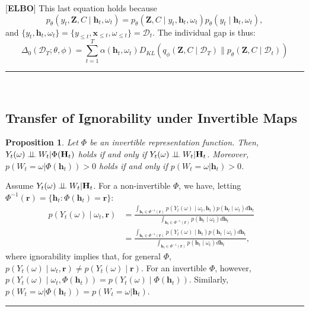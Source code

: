 \documentclass[10pt]{article} %
\newcommand{\BlackBox}{\rule{1.5ex}{1.5ex}}  %
\renewenvironment{proof}{\par\noindent{\bf Proof\ }}{\hfill\BlackBox\\[2mm]}
\newenvironment{proof}{\par\noindent{\bf Proof\ }}{\hfill\BlackBox\\[2mm]}
\newtheorem{proposition}[theorem]{Proposition}
\begin{document}
\begin{proof}[\textbf{ELBO}]
This last equation holds because 
\[
p_\theta\left(y_{t}, \mathbf{Z}, C \mid \mathbf{h}_{t}, \omega_{t}\right) = p_\theta\left(\mathbf{Z}, C \mid y_{t}, \mathbf{h}_{t}, \omega_{t}\right) p_\theta\left(y_{t} \mid \mathbf{h}_{t}, \omega_{t}\right),
\]
and \(\{y_{t}, \mathbf{h}_{t}, \omega_{t}\} = \{y_{\leq t}, \mathbf{x}_{\leq t}, \omega_{\leq t}\} = \mathcal{D}_t\). The individual gap is thus:
\[
\Delta_0(\mathcal{D}_T; \theta, \phi) = \sum_{t = 1}^{T} \alpha(\mathbf{h}_t, \omega_t) D_{KL}\left(q_{\phi}(\mathbf{Z}, C \mid \mathcal{D}_T) \parallel p_\theta\left(\mathbf{Z}, C\mid \mathcal{D}_t\right) \right)
\]
\end{proof}
\subsection{Transfer of Ignorability under Invertible Maps}
\label{appendix:proof_ignorability_invsersion}
\begin{proposition}
Let \(\Phi\) be an invertible representation function. Then, \(Y_{t}(\omega) \perp \!\!\! \perp W_{t}| \Phi(\mathbf{H}_{t})\) holds if and only if \(Y_{t}(\omega) \perp \!\!\! \perp W_{t}| \mathbf{H}_{t}\). Moreover, \(p(W_t=\omega|\Phi(\mathbf{h}_{t}))>0\) holds if and only if \(p(W_t=\omega|\mathbf{h}_{t})>0\).
\end{proposition}
\begin{proof}
    Assume \(Y_{t}(\omega) \perp \!\!\! \perp W_{t}| \mathbf{H}_{t}\). For a non-invertible \(\Phi\), we have, letting \(\Phi^{-1}(\mathbf{r}) = \{\mathbf{h}_t:  \Phi(\mathbf{h}_t) = \mathbf{r}\}\):
    \begin{align}
 p(Y_t(\omega)\mid \omega_t, \mathbf{r}) &= \frac{\int_{\mathbf{h}_t \in \Phi^{-1}(\mathbf{r})}p(Y_t(\omega)\mid \omega_t, \mathbf{h}_t)p(\mathbf{h}_t\mid \omega_t)d\mathbf{h}_t}{\int_{\mathbf{h}_t \in \Phi^{-1}(\mathbf{r})}p(\mathbf{h}_t\mid \omega_t)d\mathbf{h}_t}  \nonumber &\\
     &=  \frac{\int_{\mathbf{h}_t \in \Phi^{-1}(\mathbf{r})}p(Y_t(\omega)\mid \mathbf{h}_t)p(\mathbf{h}_t\mid \omega_t)d\mathbf{h}_t}{\int_{\mathbf{h}_t \in \Phi^{-1}(\mathbf{r})}p(\mathbf{h}_t\mid \omega_t)d\mathbf{h}_t},
     \label{eq:int_rep}
\end{align}
where ignorability implies that, for general \(\Phi\), \(p(Y_t(\omega)\mid \omega_t, \mathbf{r}) \neq p(Y_t(\omega)\mid \mathbf{r})\). For an invertible \(\Phi\), however, \(p(Y_t(\omega)\mid \omega_t, \Phi(\mathbf{h}_t)) = p(Y_t(\omega)\mid \Phi(\mathbf{h}_t))\). Similarly, \(p(W_t=\omega| \Phi(\mathbf{h}_{t})) = p(W_t=\omega| \mathbf{h}_{t})\).
\end{proof}
\end{document}
